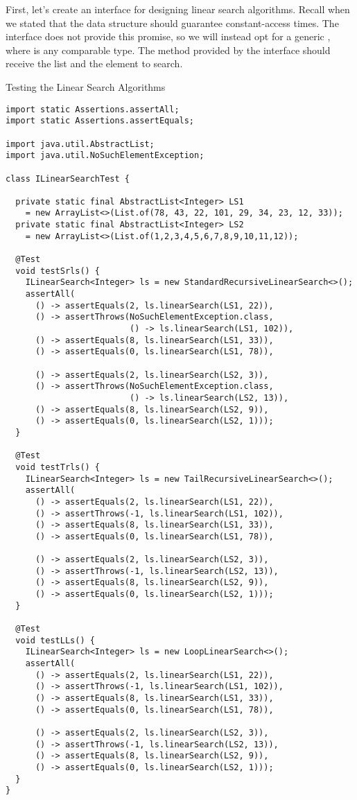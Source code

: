 First, let's create an interface for designing linear search algorithms. Recall when we stated that the data structure should guarantee constant-access times. The  interface does not provide this promise, so we will instead opt for a generic , where  is any comparable type. The method provided by the interface should receive the list and the element to search.

\begin{cl}[]{Testing the Linear Search Algorithms}
\begin{lstlisting}[language=MyJava]
import static Assertions.assertAll;
import static Assertions.assertEquals;

import java.util.AbstractList;
import java.util.NoSuchElementException;

class ILinearSearchTest {

  private static final AbstractList<Integer> LS1 
    = new ArrayList<>(List.of(78, 43, 22, 101, 29, 34, 23, 12, 33));
  private static final AbstractList<Integer> LS2 
    = new ArrayList<>(List.of(1,2,3,4,5,6,7,8,9,10,11,12));

  @Test
  void testSrls() {
    ILinearSearch<Integer> ls = new StandardRecursiveLinearSearch<>();
    assertAll(
      () -> assertEquals(2, ls.linearSearch(LS1, 22)),
      () -> assertThrows(NoSuchElementException.class, 
                         () -> ls.linearSearch(LS1, 102)),
      () -> assertEquals(8, ls.linearSearch(LS1, 33)),
      () -> assertEquals(0, ls.linearSearch(LS1, 78)),

      () -> assertEquals(2, ls.linearSearch(LS2, 3)),
      () -> assertThrows(NoSuchElementException.class, 
                         () -> ls.linearSearch(LS2, 13)),
      () -> assertEquals(8, ls.linearSearch(LS2, 9)),
      () -> assertEquals(0, ls.linearSearch(LS2, 1)));
  }

  @Test
  void testTrls() {
    ILinearSearch<Integer> ls = new TailRecursiveLinearSearch<>();
    assertAll(
      () -> assertEquals(2, ls.linearSearch(LS1, 22)),
      () -> assertThrows(-1, ls.linearSearch(LS1, 102)),
      () -> assertEquals(8, ls.linearSearch(LS1, 33)),
      () -> assertEquals(0, ls.linearSearch(LS1, 78)),

      () -> assertEquals(2, ls.linearSearch(LS2, 3)),
      () -> assertThrows(-1, ls.linearSearch(LS2, 13)),
      () -> assertEquals(8, ls.linearSearch(LS2, 9)),
      () -> assertEquals(0, ls.linearSearch(LS2, 1)));
  }

  @Test
  void testLLs() {
    ILinearSearch<Integer> ls = new LoopLinearSearch<>();
    assertAll(
      () -> assertEquals(2, ls.linearSearch(LS1, 22)),
      () -> assertThrows(-1, ls.linearSearch(LS1, 102)),
      () -> assertEquals(8, ls.linearSearch(LS1, 33)),
      () -> assertEquals(0, ls.linearSearch(LS1, 78)),

      () -> assertEquals(2, ls.linearSearch(LS2, 3)),
      () -> assertThrows(-1, ls.linearSearch(LS2, 13)),
      () -> assertEquals(8, ls.linearSearch(LS2, 9)),
      () -> assertEquals(0, ls.linearSearch(LS2, 1)));
  }
}
\end{lstlisting}
\end{cl}

